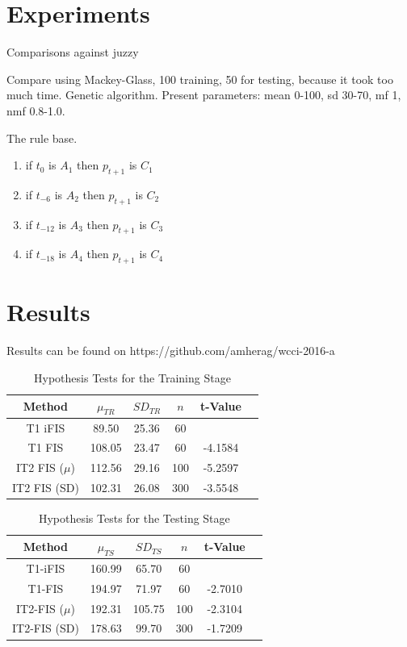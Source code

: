 \documentclass[conference]{IEEEtran}
\begin{document}
\section{Experiments}

Comparisons against juzzy \cite{wagner2013juzzy}

Compare using Mackey-Glass, 100 training, 50 for testing, because it
took too much time. Genetic algorithm. Present parameters: mean 0-100,
sd 30-70, mf 1, nmf 0.8-1.0.

The rule base.

\begin{enumerate}
  \item if $t_{0}$ is $A_{1}$ then $p_{t+1}$ is $C_{1}$
  \item if $t_{-6}$ is $A_{2}$ then $p_{t+1}$ is $C_{2}$
  \item if $t_{-12}$ is $A_{3}$ then $p_{t+1}$ is $C_{3}$
  \item if $t_{-18}$ is $A_{4}$ then $p_{t+1}$ is $C_{4}$
\end{enumerate}

\section{Results}

Results can be found on https://github.com/amherag/wcci-2016-a

\begin{table}[!t]
  \renewcommand{\arraystretch}{1.3}
  \caption{Hypothesis Tests for the Training Stage}
  \label{hypothesis-tests-training}
  \centering
  \begin{tabular}{|c|c|c|c|c|c|}
    \hline
    Method & $\mu_{TR}$ & $SD_{TR}$ & $n$ & t-Value\\
    \hline
    T1 iFIS & 89.50 & 25.36 & 60 & \\
    \hline
    T1 FIS & 108.05 & 23.47 & 60 & -4.1584 \\
    \hline
    IT2 FIS (\(\mu\)) & 112.56 & 29.16 & 100 & -5.2597 \\
    \hline
    IT2 FIS (SD) & 102.31 & 26.08 & 300 & -3.5548 \\
    \hline
  \end{tabular}
\end{table}

\begin{table}[!t]
  \renewcommand{\arraystretch}{1.3}
  \caption{Hypothesis Tests for the Testing Stage}
  \label{hypothesis-tests}
  \centering
  \begin{tabular}{|c|c|c|c|c|c|}
    \hline
    Method & $\mu_{TS}$ & $SD_{TS}$ & $n$ & t-Value\\
    \hline
    T1-iFIS & 160.99 & 65.70 & 60 & \\
    \hline
    T1-FIS & 194.97 & 71.97 & 60 & -2.7010 \\
    \hline
    IT2-FIS (\(\mu\)) & 192.31 & 105.75 & 100 & -2.3104 \\
    \hline
    IT2-FIS (SD) & 178.63 & 99.70 & 300 & -1.7209 \\
    \hline
  \end{tabular}
\end{table}
\end{document}
